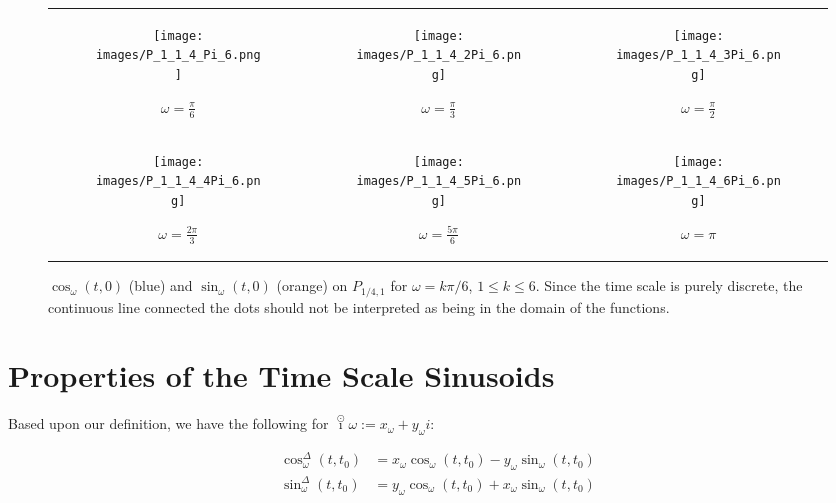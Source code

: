 \documentclass[reqno]{amsart}
\theoremstyle{plain}
\theoremstyle{definition}
\numberwithin{theorem}{section}
\numberwithin{definition}{section}
\numberwithin{prop}{section}
\numberwithin{example}{section}
\def\icirc{\overset{\odot}{\imath}}
\begin{document}
\begin{figure}
\begin{tabular}{ccc}
\begin{subfigure}{0.33\textwidth}\centering\texttt{[image: images/P\_1\_1\_4\_Pi\_6.png]}\caption{$\omega = \frac{\pi}{6}$}\label{fig:o2_1}\end{subfigure}&
\begin{subfigure}{0.33\textwidth}\centering\texttt{[image: images/P\_1\_1\_4\_2Pi\_6.png]}\caption{$\omega = \frac{\pi}{3}$}\label{fig:o2_2}\end{subfigure}&
\begin{subfigure}{0.33\textwidth}\centering\texttt{[image: images/P\_1\_1\_4\_3Pi\_6.png]}\caption{$\omega = \frac{\pi}{2}$}\label{fig:o1_3}\end{subfigure}\\
\newline
\begin{subfigure}{0.33\textwidth}\centering\texttt{[image: images/P\_1\_1\_4\_4Pi\_6.png]}\caption{$\omega = \frac{2 \pi}{3}$}\label{fig:o1_4}\end{subfigure}&
\begin{subfigure}{0.33\textwidth}\centering\texttt{[image: images/P\_1\_1\_4\_5Pi\_6.png]}\caption{$\omega = \frac{5 \pi}{6}$}\label{fig:o1_5}\end{subfigure}&
\begin{subfigure}{0.33\textwidth}\centering\texttt{[image: images/P\_1\_1\_4\_6Pi\_6.png]}\caption{$\omega = \pi$}\label{fig:o1_6}\end{subfigure}\\
\end{tabular}
\caption{$\cos_{\omega}(t,0)$ (blue) and $\sin_{\omega}(t,0)$ (orange) on $P_{1/4,1}$ for $\omega = k \pi/6$, $1 \leq k \leq 6$. Since the time scale is purely discrete, the continuous line connected the dots should not be interpreted as being in the domain of the functions.}
\label{fig:P_141_Sin}
\end{figure}

\newpage


\section{Properties of the Time Scale Sinusoids}
Based upon our definition, we have the following for $\icirc \omega:=x_\omega+y_\omega i$:

\begin{subequations}
\begin{align}
\cos^{\Delta}_\omega(t,t_0) &= x_\omega\cos_\omega(t,t_0)-y_\omega\sin_\omega(t,t_0)\\
\sin^{\Delta}_\omega(t,t_0) &= y_\omega\cos_\omega(t,t_0)+x_\omega\sin_\omega(t,t_0)  
\end{align}\label{deriv_results}
\end{subequations}
\end{document}
